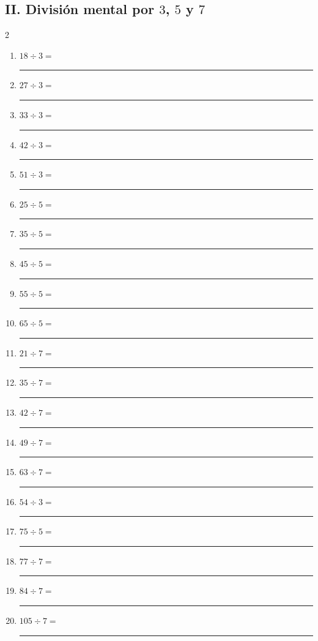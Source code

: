 \documentclass[11pt]{article}
\begin{document}
\subsection*{II. División mental por $3$, $5$ y $7$}
\begin{multicols}{2}\begin{enumerate}[leftmargin=*,start=16]
\item $\displaystyle 18\div3=$ \rule{2.0cm}{0.4pt}
\item $\displaystyle 27\div3=$ \rule{2.0cm}{0.4pt}
\item $\displaystyle 33\div3=$ \rule{2.0cm}{0.4pt}
\item $\displaystyle 42\div3=$ \rule{2.0cm}{0.4pt}
\item $\displaystyle 51\div3=$ \rule{2.0cm}{0.4pt}
\item $\displaystyle 25\div5=$ \rule{2.0cm}{0.4pt}
\item $\displaystyle 35\div5=$ \rule{2.0cm}{0.4pt}
\item $\displaystyle 45\div5=$ \rule{2.0cm}{0.4pt}
\item $\displaystyle 55\div5=$ \rule{2.0cm}{0.4pt}
\item $\displaystyle 65\div5=$ \rule{2.0cm}{0.4pt}
\item $\displaystyle 21\div7=$ \rule{2.0cm}{0.4pt}
\item $\displaystyle 35\div7=$ \rule{2.0cm}{0.4pt}
\item $\displaystyle 42\div7=$ \rule{2.0cm}{0.4pt}
\item $\displaystyle 49\div7=$ \rule{2.0cm}{0.4pt}
\item $\displaystyle 63\div7=$ \rule{2.0cm}{0.4pt}
\item $\displaystyle 54\div3=$ \rule{2.0cm}{0.4pt}
\item $\displaystyle 75\div5=$ \rule{2.0cm}{0.4pt}
\item $\displaystyle 77\div7=$ \rule{2.0cm}{0.4pt}
\item $\displaystyle 84\div7=$ \rule{2.0cm}{0.4pt}
\item $\displaystyle 105\div7=$ \rule{2.0cm}{0.4pt}
\end{enumerate}\end{multicols}
\end{document}
